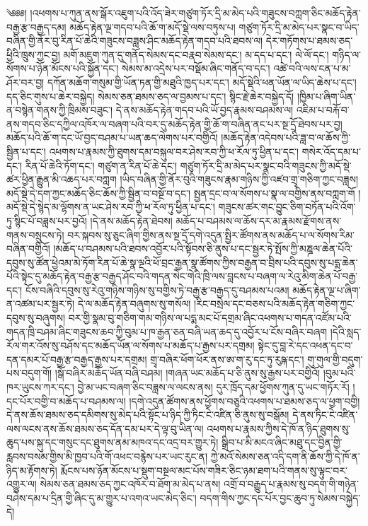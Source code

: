 ༄༅༅། །འཕགས་པ་ཀུན་ནས་སྒོར་འཇུག་པའི་འོད་ཟེར་གཙུག་ཏོར་དྲི་མ་མེད་པའི་གཟུངས་བཀླག་ཅིང་མཆོད་རྟེན་བརྒྱ་རྩ་བརྒྱད་དམ། མཆོད་རྟེན་ལྔ་གདབ་པའི་ཆོ་ག་མདོ་སྡེ་ལས་བཏུས་པ། གཙུག་ཏོར་དྲི་མ་མེད་པར་སྣང་བ་ཡིད་བཞིན་གྱི་ནོར་བུ་རིན་པོ་ཆེའི་གཟུངས་བཟླས་ཤིང་མཆོད་རྟེན་གདབ་པའི་ཐབས་ལ། དེར་གཏོགས་པ་ཐམས་ཅད་ཕྱིའི་ཁྲུས་ཀྱང་བྱ། མགོ་མཇུག་ཀུན་དུ་གནོད་སེམས་དང་བརྣབ་སེམས་དང་། མ་དད་པ་དང་། ལེ་ལོ་དང་། གཉིད་ལ་སོགས་པ་ཉོན་མོངས་པའི་སྐྱོན་དང་། སེམས་མ་འདྲེས་པར་བསྡོམ་ཞིང་གནོད་བ་དང་། འཚེ་བའི་ལས་ངན་པ་མ་ཤོར་བར་བྱ། དཀོན་མཆོག་གསུམ་གྱི་ཡོན་ཏན་གྱི་མཐུའི་ཁྱད་པར་དང་། མདོ་སྡེའི་ཕན་ཡོན་ལ་ཡིད་ཆེས་པ་དང་། དད་ཅིང་གུས་པ་ཆེར་བསྐྱེད། སེམས་ཅན་ཐམས་ཅད་ལ་བྱམས་པ་དང་། སྙིང་རྗེ་ཆེར་བསྐྱེད་དོ། །ཁྱིམ་པ་ཞིག་ཡིན་ན་བསྙེན་གནས་ཀྱི་ཁྲིམས་བཟུང་། དེ་ནས་མཆོད་རྟེན་གདབ་པའི་ཡོ་བྱད་རྣམས་བཤམས་ལ། འཇིམ་པ་བརྐོ་བ་ནས་གདབ་ཅིང་དཀྱིལ་འཁོར་ལ་བཞག་པའི་བར་དུ་མཆོད་རྟེན་གྱི་ཆོ་ག་བཞིན་ནང་པར་སྔ་དྲོ་ཐེབས་པར་བྱ། མཆོད་པའི་ཆོ་ག་དང་ཡོ་བྱད་བཤམ་པ་ཡན་ཆད་ལེགས་པར་བགྱིའོ། །མཆོད་རྟེན་འདེབས་པའི་ཟླ་བ་ལ་ཆོས་ཀྱི་སྦྱིན་པ་དང་། འཕགས་པ་རྣམས་ཀྱི་ཐུགས་དམ་བསྐུལ་བར་ཤེས་རབ་ཀྱི་ཕ་རོལ་ཏུ་ཕྱིན་པ་དང་། གསེར་འོད་དམ་པ་དང་། རིན་པོ་ཆེའི་ཏོག་དང་། གཙུག་ན་རིན་པོ་ཆེ་དང་། གཙུག་ཏོར་དྲི་མ་མེད་པར་སྣང་བའི་གཟུངས་ཀྱི་མདོ་སྡེ་ཚར་ཕྱིན་རྒྱུན་མི་འཆད་པར་བཀླག །ཡིད་བཞིན་གྱི་ནོར་བུའི་གཟུངས་རྣམ་གཉིས་ཀྱི་འཛབ་གྲྭ་གཅིག་ཀྱང་བཟླས། མདོ་སྡེ་དེ་དག་ཀྱང་མཆོད་ཅིང་ཆོས་ཀྱི་སྦྱིན་བ་བསྔོ་བ་དང་། སྤྱན་དྲང་བ་ལ་སོགས་པ་སྣ་ལ་བགྱིས་ནས་བཀླག་གོ །མདོ་སྡེ་དེ་སྙེད་མ་ལྷོགས་ན་ཡང་ཤེས་རབ་ཀྱི་ཕ་རོལ་ཏུ་ཕྱིན་པ་དང་། གཟུངས་ཚར་གང་བྱུང་ཅིག་བཏོན་པའི་འོག་ཏུ་སྙིང་པོ་བཟླས་པར་བྱའོ། །དེ་ནས་མཆོད་རྟེན་ཐེབས། མཆོད་པ་བཤམས་ལ་ཆོས་དར་མ་རྣམས་རྫོགས་ནས་གནས་བསྲུངས་ཏེ། བར་སྐབས་སུ་ཅུང་ཞིག་གྱིས་ནས་སྔ་དྲོ་དགེ་འདུན་སྤྱིར་ཚོགས་ནས་མཆོད་པ་ལ་སོགས་རིམ་བཞིན་བགྱིའོ། །མཆོད་པ་བཤམས་པའི་ཐབས་འབྱོར་པའི་སྟོབས་ཅི་ནུས་པ་དང་སྦྱར་ཏེ་སྤོས་ཀྱི་མཎྜལ་ཆེན་པོའི་དབུས་སུ་ཚོན་ཕྱེའམ་མེ་ཏོག་རིན་པོ་ཆེ་སྣ་ལྔའི་ཕོ་བྲང་རྒྱན་སྣ་ཚོགས་ཀྱིས་བརྒྱན་བ་བྲིས་པའི་དབུས་སུ་པདྨ་ཆེན་པོའི་སྟེང་དུ་མཆོད་རྟེན་བརྒྱ་རྩ་བརྒྱད་ཤོང་བའི་གདན་སེང་གེའི་ཁྲི་ལས་བླངས་པ་བཞག་ལ་རེའུ་མིག་ཆེན་པོ་བརྒྱ་དང་། ངོས་བཞིའི་དབུས་སུ་རེའུ་གཉིས་གཉིས་སུ་བགྱིས་ཏེ་བརྒྱ་རྩ་བརྒྱད་དུ་བཤམས་པའམ། མཆོད་རྟེན་ལྔ་པ་ཞིག་ན་འཚམ་པར་སྦྱར་ཏེ། དེ་ལ་མཆོད་རྟེན་བཞུགས་སུ་གསོལ། །རིང་བསྲེལ་དང་བཅས་པའི་མཆོད་རྟེན་གཅིག་ཀྱང་དབུས་སུ་བཞུགས། བར་གྱི་སྣམ་བུ་གཅིག་གམ་གཉིས་ལ་པདྨ་མང་པོ་དགྲམ་ཞིང་འཕགས་པ་གདན་འཛོམ་པའི་གདན་ཁྲི་བཤམ་ཞིང་གཟུངས་ཆབ་ཀྱི་བུམ་པ་ཁ་རྒྱན་ཅན་བཞི་ཡན་ཆད་དུ་འབྱོར་པ་ངོས་བཞིར་བཞག །དེའི་སླད་རོལ་གར་འོས་སུ་བཤོས་དང་མཆོད་ཡོན་ལ་སོགས་པ་མཆོད་པ་རྒྱས་པར་དགྲམ། སྟེང་དུ་བླ་རེ་དང་འཕན་དང་བ་དན་དམར་པོ་བརྒྱ་རྩ་བརྒྱད་རྒྱས་པར་དགྲམ། གྲྭ་བཞིར་ཕོག་ཕོར་ནས་ཨ་ག་རུ་དང་ཏུ་རུཥྐ་དང་། གུ་གུལ་གྱི་བདུག་པས་བདུག་གོ། །སྒོ་བཞིར་མཆོད་ཡོན་བཞི་བཤམ། །གཞན་ཡང་མཆོད་པ་ཅི་ནུས་སུ་རྒྱས་པར་བགྱིའོ། །བུམ་པའི་ཁར་ཡུངས་ཀར་དང་། བྱེ་མ་ཡང་བཞག་ཅིང་བཟླས་ལ་ལངས་ནས། དུར་ཁྲོད་དམ་ཕྱོགས་ཀུན་དུ་ཡང་གཏོར་རོ། །དང་པོར་བགྱི་བ་མཆོད་པ་བཤམས་ལ། །དགེ་འདུན་ཚོགས་ནས་ཕྱོགས་བཅུའི་འཕགས་པ་ཐམས་ཅད་ལ་ཕྱག་བགྱི། དེ་ནས་ཆོས་ཐམས་ཅད་དམིགས་སུ་མེད་པའི་སྟོང་པ་ཉིད་ཀྱི་ཏིང་ངེ་འཛིན་ཅི་ནུས་སུ་བསྒོམ། དེ་ནས་ཏིང་ངེ་འཛིན་ལས་ལངས་ནས་ཆོས་ཐམས་ཅད་དོན་དམ་པར་དེ་ལྟ་བུ་ཡིན་ལ། འཕགས་པ་རྣམས་ཀྱིས་དེ་ཁོ་ན་ཉིད་ཐུགས་སུ་ཆུད་པས་སྐུ་དང་གསུང་དང་ཐུགས་ནམ་མཁའ་དང་འདྲ་བར་གྱུར་ཏེ། སྒྲིབ་པ་མི་མངའ་ཞིང་མཐུ་དང་བྱིན་གྱི་རླབས་བསམ་གྱིས་མི་ཁྱབ་པའི་གོ་འཕང་བརྙེས་པར་ཡང་རུང་ན། ཀྱེ་མའོ་སེམས་ཅན་འདི་དག་ནི་ཆོས་ཀྱི་དེ་ཁོ་ན་ཉིད་མ་རྟོགས་ཏེ། རྨོངས་པས་ཉོན་མོངས་པ་སྡུག་བསྔལ་མང་པོས་གཟིར་ཅིང་ཉམ་ཐག་པའི་གནས་སུ་ལྟུང་བར་འགྱུར་ལ། སེམས་ཅན་ཐམས་ཅད་ཀྱང་འཁོར་བ་ཐོག་མ་མེད་པ་ནས། འགྲོ་བ་བརྒྱུད་པ་རྣམས་སུ་བདག་གི་གཉེན་བཤེས་དམ་པ་དྲིན་གྱི་ཞིང་དུ་མ་གྱུར་པ་འགའ་ཡང་མེད་ཅིང་། བདག་གིས་ཀྱང་དང་པོར་བྱང་ཆུབ་ཏུ་སེམས་བསྐྱེད་དེ། 